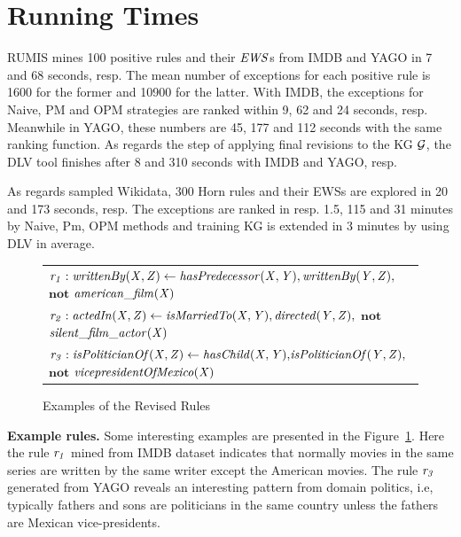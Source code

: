 \section{Running Times}

RUMIS mines 100 positive rules and their $\mathit{EWS}$s from IMDB and YAGO in 7 and 68 seconds, resp. The mean number of exceptions for each positive rule is 1600 for the former and 10900 for the latter. With IMDB, the exceptions for Naive, PM and OPM strategies are ranked within 9, 62 and 24 seconds, resp. Meanwhile in YAGO, these numbers are 45, 177 and 112 seconds with the same ranking function. As regards the step of applying final revisions to the KG $\mathcal{G}$, the DLV tool finishes after 8 and 310 seconds with IMDB and YAGO, resp.

As regards sampled Wikidata, 300 Horn rules and their EWSs are explored in 20 and 173 seconds, resp. The exceptions are ranked in resp. 1.5, 115 and 31 minutes by Naive, Pm, OPM methods and training KG is extended in 3 minutes by using DLV in average.

\begin{figure}[t]
    \centering
   
    \vspace{-.2cm}
    \begin{tabular}{l}
 {\scriptsize
        $\mathit{r_1: writtenBy(X, Z)}  \leftarrow
        \mathit{hasPredecessor(X, Y)},\mathit{writtenBy(Y, Z)},$ $ \textbf{not}$  $\mathit{american\_film(X)} $}\\        
       {\scriptsize 
$\mathit{r_2:  actedIn(X, Z)}  \leftarrow
        \mathit{isMarriedTo(X, Y)},\mathit{directed(Y, Z)},$ $ \textbf{not}$  $\mathit{silent\_film\_actor(X)} $} \\
          {\scriptsize 
$\mathit{r_3:  isPoliticianOf(X, Z)}  \leftarrow
        \mathit{hasChild(X, Y)}{,}\mathit{isPoliticianOf(Y, Z)}{,}$$ \textbf{not}$  $\mathit{vicepresidentOfMexico(X)} $} \\
 \end{tabular}            
    \caption{Examples of the Revised Rules}
 \label{fig:examplerules}
 \vspace{-.4cm}
\end{figure}

\textbf{Example rules.} Some interesting examples are presented in the Figure~\ref{fig:examplerules}. Here 
the rule $\mathit{r_1}$ mined from IMDB dataset indicates that normally movies in the same series are written by the same writer except the American movies. The rule $\mathit{r_3}$ generated from YAGO reveals an interesting pattern from domain politics, i.e, typically fathers and sons are politicians in the same country unless the fathers are Mexican vice-presidents.